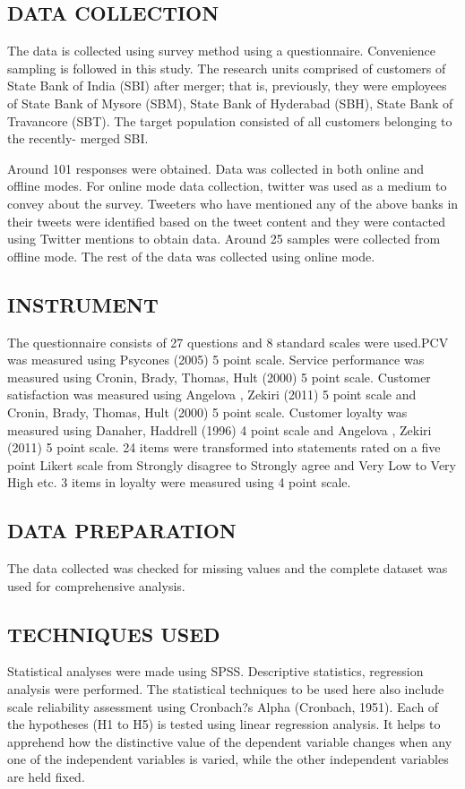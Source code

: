 \documentclass[a4paper, 14pt]{article}
\begin{document}
{\subsection{DATA COLLECTION}
\par The data is collected using survey method using a questionnaire. Convenience sampling is followed in this study. The research units comprised of customers of State Bank of India (SBI) after merger; that is, previously, they were employees of State Bank of Mysore (SBM), State Bank of Hyderabad (SBH), State Bank of Travancore (SBT). The target population consisted of all customers belonging to the recently- merged SBI. 
\par Around 101 responses were obtained. Data was collected in both online and offline modes. For online mode data collection, twitter was used as a medium to convey about the survey. Tweeters who have mentioned any of the above banks in their tweets were identified based on the tweet content and they were contacted using Twitter mentions to obtain data. Around 25 samples were collected from offline mode. The rest of the data was collected using online mode.

\subsection{INSTRUMENT}
The questionnaire consists of 27 questions and 8 standard scales were used.PCV was measured using Psycones (2005)  5 point scale. Service performance was measured using Cronin, Brady, Thomas, Hult (2000)  5 point scale. Customer satisfaction was measured using 
Angelova , Zekiri (2011)  5 point scale and Cronin, Brady, Thomas, Hult (2000)  5 point scale. Customer loyalty was measured using Danaher, Haddrell (1996) 4 point scale and Angelova , Zekiri (2011) 5 point scale. 24 items were transformed into statements rated on a five  point Likert scale from Strongly disagree to Strongly agree and Very Low to Very High etc. 3 items in loyalty were measured using 4 point scale.

\subsection{DATA PREPARATION}
The data collected was checked for missing values and the complete dataset was used for comprehensive analysis.

\subsection{TECHNIQUES USED}
Statistical analyses were made using SPSS. Descriptive statistics, regression analysis were performed. The statistical techniques to be used here also include scale reliability assessment using Cronbach?s Alpha (Cronbach, 1951). Each of the hypotheses (H1 to H5) is tested using linear regression analysis. It helps to apprehend how the distinctive value of the dependent variable changes when any one of the independent variables is varied, while the other independent variables are held fixed. 

}
\end{document}
